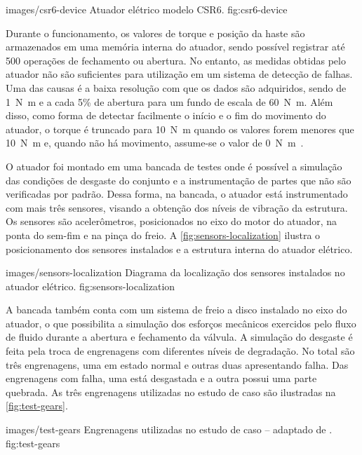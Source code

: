   {images/csr6-device}
  {Atuador elétrico modelo CSR6.}
  {fig:csr6-device}

Durante o funcionamento, os valores de torque e posição da haste são armazenados em uma memória
interna do atuador, sendo possível registrar até \num{500} operações de fechamento ou abertura. No
entanto, as medidas obtidas pelo atuador não são suficientes para utilização em um sistema de
detecção de falhas. Uma das causas é a baixa resolução com que os dados são adquiridos, sendo de
\SI{1}{\newton\meter} e a cada 5\% de abertura para um fundo de escala de \SI{60}{\newton\meter}.
Além disso, como forma de detectar facilmente o início e o fim do movimento do atuador, o torque é
truncado para \SI{10}{\newton\meter} quando os valores forem menores que \SI{10}{\newton\meter} e,
quando não há movimento, assume-se o valor de \SI{0}{\newton\meter}~\cite{lazzaretti2012avaliacao}.

O atuador foi montado em uma bancada de testes onde é possível a simulação das condições de desgaste
do conjunto e a instrumentação de partes que não são verificadas por padrão. Dessa forma, na
bancada, o atuador está instrumentado com mais três sensores, visando a obtenção dos níveis de
vibração da estrutura. Os sensores são acelerômetros, posicionados no eixo do motor do atuador, na
ponta do sem-fim e na pinça do freio. A \cref{fig:sensors-localization} ilustra o posicionamento dos
sensores instalados e a estrutura interna do atuador elétrico.


  {images/sensors-localization}
  {Diagrama da localização dos sensores instalados no atuador elétrico.}
  {fig:sensors-localization}

A bancada também conta com um sistema de freio a disco instalado no eixo do atuador, o que
possibilita a simulação dos esforços mecânicos exercidos pelo fluxo de fluido durante a abertura e
fechamento da válvula. A simulação do desgaste é feita pela troca de engrenagens com diferentes
níveis de degradação. No total são três engrenagens, uma em estado normal e outras duas apresentando
falha. Das engrenagens com falha, uma está desgastada e a outra possui uma parte quebrada. As três
engrenagens utilizadas no estudo de caso são ilustradas na \cref{fig:test-gears}.

  {images/test-gears}
  {Engrenagens utilizadas no estudo de caso -- adaptado de \cite{lazzaretti2012avaliacao}.}
  {fig:test-gears}

